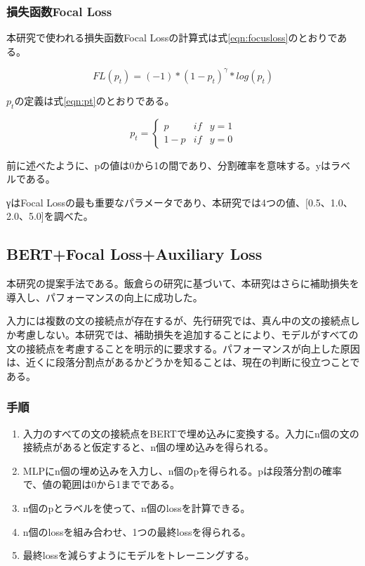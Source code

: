 \documentclass[
  platex, dvipdfmx,  %
]{nlp2021}
\begin{document}
\subsubsection{損失函数Focal Loss}
\label{section:focusloss}


本研究で使われる損失函数Focal Lossの計算式は式\ref{eqn:focusloss}のとおりである。

\begin{equation}
  \label{eqn:focusloss}
  FL(p_t) = ( - 1 ) * ( 1 - p_t )^\gamma  * log ( p_t )  
\end{equation}

$p_t$の定義は式\ref{eqn:pt}のとおりである。

\begin{equation}
  \label{eqn:pt}
  p_t = \left\{\begin{matrix}
    p & if & y = 1 \\ 
    1-p & if & y = 0
    \end{matrix}\right.
\end{equation}

前に述べたように、pの値は0から1の間であり、分割確率を意味する。yはラベルである。

γはFocal Lossの最も重要なパラメータであり、本研究では4つの値、[0.5、1.0、2.0、5.0]を調べた。


\subsection{BERT+Focal Loss+Auxiliary Loss}

本研究の提案手法である。飯倉らの研究に基づいて、本研究はさらに補助損失を導入し、パフォーマンスの向上に成功した。

入力には複数の文の接続点が存在するが、先行研究では、真ん中の文の接続点しか考慮しない。本研究では、補助損失を追加することにより、モデルがすべての文の接続点を考慮することを明示的に要求する。パフォーマンスが向上した原因は、近くに段落分割点があるかどうかを知ることは、現在の判断に役立つことである。

\subsubsection{手順}


\begin{enumerate}
  \item 入力のすべての文の接続点をBERTで埋め込みに変換する。入力にn個の文の接続点があると仮定すると、n個の埋め込みを得られる。
  \item MLPにn個の埋め込みを入力し、n個のpを得られる。pは段落分割の確率で、値の範囲は0から1までである。
  \item n個のpとラベルを使って、n個のlossを計算できる。
  \item n個のlossを組み合わせ、1つの最終lossを得られる。
  \item 最終lossを減らすようにモデルをトレーニングする。
\end{enumerate}
\end{document}
